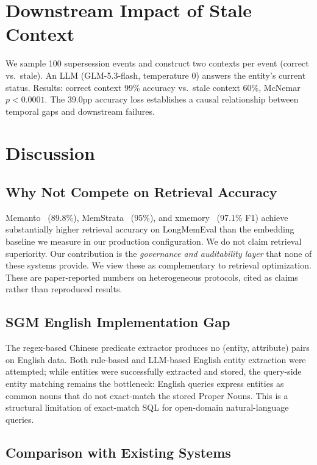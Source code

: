 \documentclass{article}
\begin{document}
\section{Downstream Impact of Stale Context}
\label{sec:downstream-harm}

We sample 100 supersession events and construct two contexts per event (correct vs.\ stale). An LLM (GLM-5.3-flash, temperature 0) answers the entity's current status. Results: correct context 99\% accuracy vs.\ stale context 60\%, McNemar $p < 0.0001$. The 39.0pp accuracy loss establishes a causal relationship between temporal gaps and downstream failures.

\section{Discussion}
\label{sec:disc}

\subsection{Why Not Compete on Retrieval Accuracy}
Memanto~\citep{memanto} (89.8\%), MemStrata~\citep{memstrata} (95\%), and xmemory~\citep{xmemory} (97.1\% F1) achieve substantially higher retrieval accuracy on LongMemEval than the embedding baseline we measure in our production configuration. We do not claim retrieval superiority. Our contribution is the \emph{governance and auditability layer} that none of these systems provide. We view these as complementary to retrieval optimization. These are paper-reported numbers on heterogeneous protocols, cited as claims rather than reproduced results.

\subsection{SGM English Implementation Gap}
The regex-based Chinese predicate extractor produces no (entity, attribute) pairs on English data. Both rule-based and LLM-based English entity extraction were attempted; while entities were successfully extracted and stored, the query-side entity matching remains the bottleneck: English queries express entities as common nouns that do not exact-match the stored Proper Nouns. This is a structural limitation of exact-match SQL for open-domain natural-language queries.
\subsection{Comparison with Existing Systems}
\end{document}
